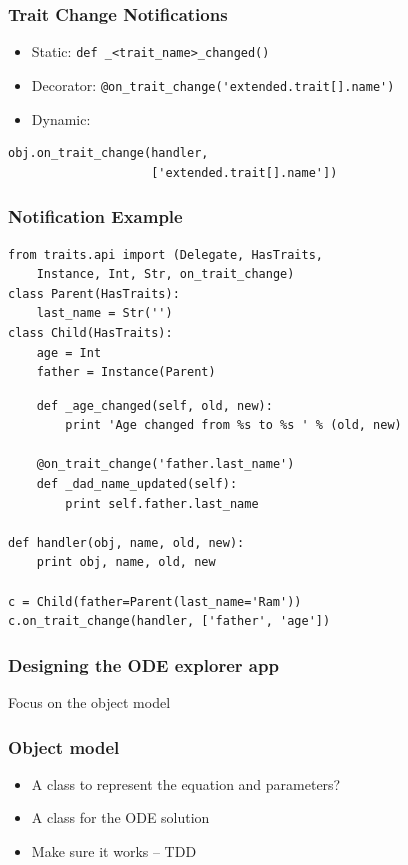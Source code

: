 \documentclass[14pt,compress]{beamer}
\newcommand{\typ}[1]{\lstinline{#1}}
\newcommand{\myemph}[1]{\structure{\emph{#1}}}
\begin{document}
\begin{frame}
    \frametitle{Trait Change Notifications}
    \vspace*{-6pt}
    \small
    \begin{itemize}
        \item Static: \typ{def _<trait_name>_changed()}
        \item Decorator: \typ{@on_trait_change('extended.trait[].name')}
        \item Dynamic:
    \end{itemize}
\begin{lstlisting}
obj.on_trait_change(handler, 
                    ['extended.trait[].name'])
\end{lstlisting}
\end{frame}

\begin{frame}
  \frametitle{Notification Example}
\vspace*{-16pt}
\footnotesize
\begin{lstlisting}
from traits.api import (Delegate, HasTraits, 
    Instance, Int, Str, on_trait_change)
class Parent(HasTraits):
    last_name = Str('') 
class Child(HasTraits):
    age = Int
    father = Instance(Parent)
\end{lstlisting}
\pause
\begin{lstlisting}
    def _age_changed(self, old, new):
        print 'Age changed from %s to %s ' % (old, new)

    @on_trait_change('father.last_name')
    def _dad_name_updated(self):
        print self.father.last_name

def handler(obj, name, old, new):
    print obj, name, old, new

c = Child(father=Parent(last_name='Ram'))
c.on_trait_change(handler, ['father', 'age'])

\end{lstlisting}
\end{frame}


\begin{frame}
  \frametitle{Designing the ODE explorer app}
  \Large
\begin{center}
    \myemph{Think!}

    \vspace*{1in}
    Focus on the object model
\end{center}
\end{frame}

\begin{frame}
  \frametitle{Object model}
  \begin{itemize}
      \item A class to represent the equation and parameters?
      \item A class for the ODE solution
      \item Make sure it works -- TDD
 \end{itemize}
\end{frame}
\end{document}
